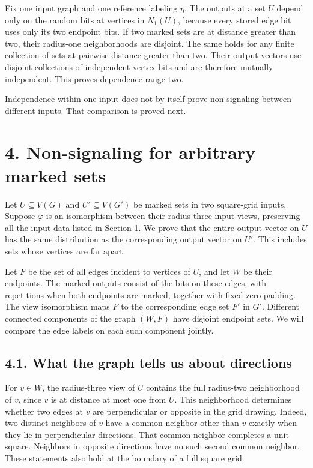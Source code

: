\documentclass[11pt,a4paper]{article}
\begin{document}
Fix one input graph and one reference labeling \(\eta\).
The outputs at a set \(U\) depend only on the random bits at vertices in \(N_1(U)\), because every stored edge bit uses only its two endpoint bits.
If two marked sets are at distance greater than two, their radius-one neighborhoods are disjoint.
The same holds for any finite collection of sets at pairwise distance greater than two.
Their output vectors use disjoint collections of independent vertex bits and are therefore mutually independent.
This proves dependence range two.

Independence within one input does not by itself prove non-signaling between different inputs.
That comparison is proved next.

\section{4. Non-signaling for arbitrary marked sets}\label{grid-nonsignaling}

Let \(U\subseteq V(G)\) and \(U'\subseteq V(G')\) be marked sets in two square-grid inputs.
Suppose \(\varphi\) is an isomorphism between their radius-three input views, preserving all the input data listed in Section 1.
We prove that the entire output vector on \(U\) has the same distribution as the corresponding output vector on \(U'\).
This includes sets whose vertices are far apart.

Let \(F\) be the set of all edges incident to vertices of \(U\), and let \(W\) be their endpoints.
The marked outputs consist of the bits on these edges, with repetitions when both endpoints are marked, together with fixed zero padding.
The view isomorphism maps \(F\) to the corresponding edge set \(F'\) in \(G'\).
Different connected components of the graph \((W,F)\) have disjoint endpoint sets.
We will compare the edge labels on each such component jointly.

\subsection{4.1. What the graph tells us about directions}

For \(v\in W\), the radius-three view of \(U\) contains the full radius-two neighborhood of \(v\), since \(v\) is at distance at most one from \(U\).
This neighborhood determines whether two edges at \(v\) are perpendicular or opposite in the grid drawing.
Indeed, two distinct neighbors of \(v\) have a common neighbor other than \(v\) exactly when they lie in perpendicular directions.
That common neighbor completes a unit square.
Neighbors in opposite directions have no such second common neighbor.
These statements also hold at the boundary of a full square grid.
\end{document}

